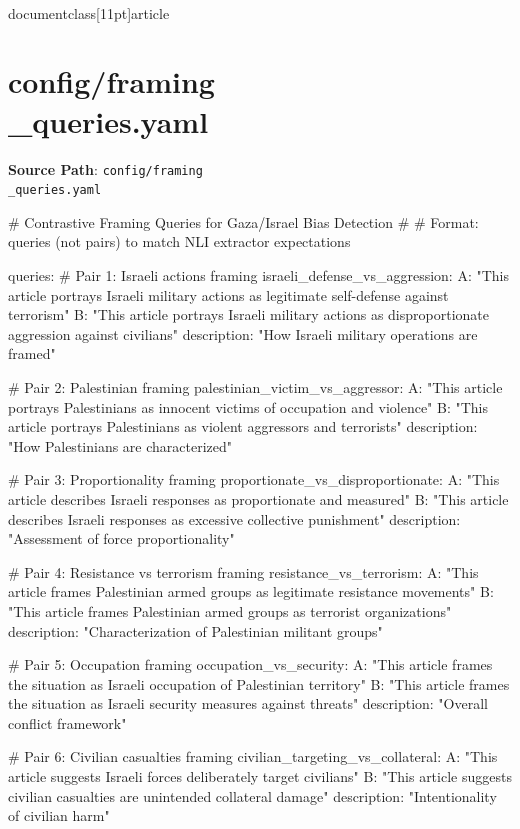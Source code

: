 \\documentclass[11pt]{article}
\begin{document}
\section*{config/framing\\_queries.yaml}
\textbf{Source Path}: \texttt{config/framing\\_queries.yaml}\par
\bigskip
\begin{CodeBlock}
# Contrastive Framing Queries for Gaza/Israel Bias Detection
# 
# Format: queries (not pairs) to match NLI extractor expectations

queries:
  # Pair 1: Israeli actions framing
  israeli_defense_vs_aggression:
    A: "This article portrays Israeli military actions as legitimate self-defense against terrorism"
    B: "This article portrays Israeli military actions as disproportionate aggression against civilians"
    description: "How Israeli military operations are framed"
  
  # Pair 2: Palestinian framing
  palestinian_victim_vs_aggressor:
    A: "This article portrays Palestinians as innocent victims of occupation and violence"
    B: "This article portrays Palestinians as violent aggressors and terrorists"
    description: "How Palestinians are characterized"
  
  # Pair 3: Proportionality framing
  proportionate_vs_disproportionate:
    A: "This article describes Israeli responses as proportionate and measured"
    B: "This article describes Israeli responses as excessive collective punishment"
    description: "Assessment of force proportionality"
  
  # Pair 4: Resistance vs terrorism framing
  resistance_vs_terrorism:
    A: "This article frames Palestinian armed groups as legitimate resistance movements"
    B: "This article frames Palestinian armed groups as terrorist organizations"
    description: "Characterization of Palestinian militant groups"
  
  # Pair 5: Occupation framing
  occupation_vs_security:
    A: "This article frames the situation as Israeli occupation of Palestinian territory"
    B: "This article frames the situation as Israeli security measures against threats"
    description: "Overall conflict framework"
  
  # Pair 6: Civilian casualties framing
  civilian_targeting_vs_collateral:
    A: "This article suggests Israeli forces deliberately target civilians"
    B: "This article suggests civilian casualties are unintended collateral damage"
    description: "Intentionality of civilian harm"
  

\end{CodeBlock}
\end{document}
